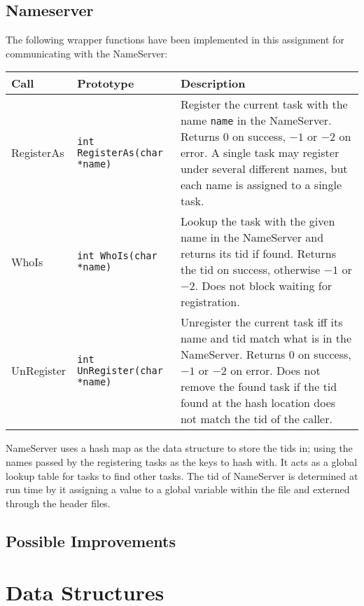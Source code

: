 \documentclass[12pt]{article}
\begin{document}
\subsection{Nameserver}
The following wrapper functions have been implemented in this assignment for communicating with the NameServer:
\begin{center}
  \begin{tabular}{|l|l|p{8cm}|}
    \hline
    {\bf Call} & {\bf Prototype} & {\bf Description} \\\hline
    RegisterAs & \texttt{int RegisterAs(char *name)} & Register the current task with the name \texttt{name} in the NameServer.  Returns $0$ on success, $-1$ or $-2$ on error. A single task may register under several different names, but each name is assigned to a single task.\\\hline
    WhoIs & \texttt{int WhoIs(char *name)} & Lookup the task with the given name in the NameServer and returns its tid if found.  Returns the tid on success, otherwise $-1$ or $-2$.  Does not block waiting for registration.\\\hline
    UnRegister & \texttt{int UnRegister(char *name)} & Unregister the current task iff its name and tid match what is in the NameServer.  Returns $0$ on success, $-1$ or $-2$ on error.  Does not remove the found task if the tid found at the hash location does not match the tid of the caller.\\\hline
  \end{tabular}
\end{center}
NameServer uses a hash map as the data structure to store the tids in; using the names passed by the registering tasks as the keys to hash with.  It acts as a global lookup table for tasks to find other tasks.  The tid of NameServer is determined at run time by it assigning a value to a global variable within the file and externed through the header files.
\\[1\baselineskip]

\subsection{Possible Improvements}

\section{Data Structures}
\end{document}
